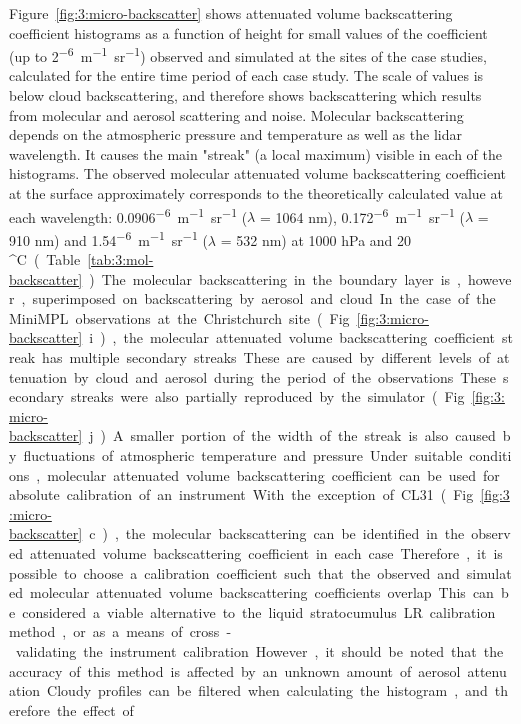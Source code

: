 Figure~\ref{fig:3:micro-backscatter} shows attenuated volume backscattering coefficient histograms as a function of
height for small values of the coefficient (up to 2\unit{^{-6}m^{-1}sr^{-1}})
observed and simulated at the sites of the case studies, calculated for
the entire time period of each case study. The scale of values is below
cloud backscattering, and therefore shows backscattering which results from molecular and
aerosol scattering and noise. Molecular backscattering depends on the
atmospheric pressure and temperature as well as the lidar wavelength.
It causes the main "streak" (a local maximum) visible in each of the histograms. The observed molecular
attenuated volume backscattering coefficient at the surface approximately corresponds to the
theoretically calculated value at each wavelength: 0.0906\unit{^{-6}m^{-1}sr^{-1}} ($\lambda$ = 1064 nm),
0.172\unit{^{-6}m^{-1}sr^{-1}} ($\lambda$ = 910 nm) and 1.54\unit{^{-6}m^{-1}sr^{-1}} ($\lambda$ = 532 nm) at 1000 hPa and 20 \unit{^\circ C}
(Table~\ref{tab:3:mol-backscatter}). The molecular backscattering in the boundary
layer is, however, superimposed on backscattering by aerosol and cloud. In the case
of the MiniMPL observations at the Christchurch site (Fig.~\ref{fig:3:micro-backscatter}i),
the molecular attenuated volume backscattering coefficient streak has multiple secondary streaks. These are caused by different levels
of attenuation by cloud and aerosol during the period of the observations.
These secondary streaks were also partially reproduced by the simulator
(Fig.~\ref{fig:3:micro-backscatter}j).
A smaller portion of the width of the streak is also caused by fluctuations of atmospheric
temperature and pressure. Under suitable conditions, molecular attenuated volume backscattering coefficient
can be used for absolute calibration of an instrument. With the exception
of CL31 (Fig.~\ref{fig:3:micro-backscatter}c), the molecular backscattering can
be identified in the observed attenuated volume backscattering coefficient in each case. Therefore, it is possible to
choose a calibration coefficient such that the observed and simulated
molecular attenuated volume backscattering coefficients overlap. This can be considered a viable alternative
to the liquid stratocumulus LR calibration method, or as a means of
cross-validating the instrument calibration. However, it should be noted that the accuracy of this method
is affected by an unknown amount of aerosol attenuation. Cloudy profiles
can be filtered when calculating the histogram, and therefore the effect of
